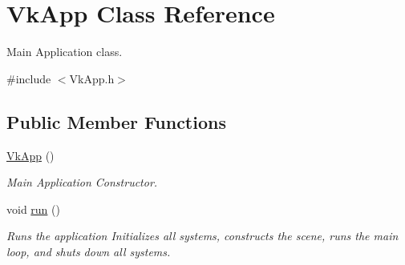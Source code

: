 \hypertarget{class_vk_app}{}\section{Vk\+App Class Reference}
\label{class_vk_app}


Main Application class.  




{\ttfamily \#include $<$Vk\+App.\+h$>$}

\subsection*{Public Member Functions}
\begin{DoxyCompactItemize}
\item 
\mbox{\label{class_vk_app_a9e3380401e14ea44a22ab9c49c34f22e}} 
\mbox{\hyperlink{class_vk_app_a9e3380401e14ea44a22ab9c49c34f22e}{Vk\+App}} ()
\begin{DoxyCompactList}\small\item\em Main Application Constructor. \end{DoxyCompactList}\item 
\mbox{\label{class_vk_app_a43ff054122c5e6b287087bf477963e65}} 
void \mbox{\hyperlink{class_vk_app_a43ff054122c5e6b287087bf477963e65}{run}} ()
\begin{DoxyCompactList}\small\item\em Runs the application Initializes all systems, constructs the scene, runs the main loop, and shuts down all systems. \end{DoxyCompactList}\end{DoxyCompactItemize}
